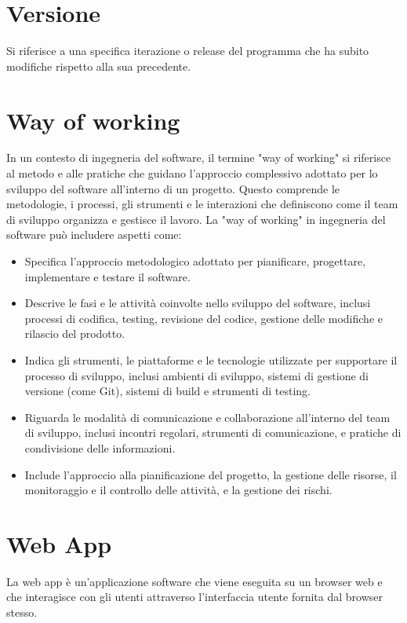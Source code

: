 \documentclass{article}
\begin{document}
\section{Versione}
Si riferisce a una specifica iterazione o release del programma che ha subito modifiche rispetto alla sua precedente.

\section{Way of working}

In un contesto di ingegneria del software, il termine "way of working" si riferisce al metodo e alle pratiche che guidano l'approccio complessivo adottato per lo sviluppo del software all'interno di un progetto. Questo comprende le metodologie, i processi, gli strumenti e le interazioni che definiscono come il team di sviluppo organizza e gestisce il lavoro. La "way of working" in ingegneria del software può includere aspetti come:
\begin{itemize}
    \item Specifica l'approccio metodologico adottato per pianificare, progettare, implementare e testare il software.
    \item Descrive le fasi e le attività coinvolte nello sviluppo del software, inclusi processi di codifica, testing, revisione del codice, gestione delle modifiche e rilascio del prodotto.
    \item Indica gli strumenti, le piattaforme e le tecnologie utilizzate per supportare il processo di sviluppo, inclusi ambienti di sviluppo, sistemi di gestione di versione (come Git), sistemi di build e strumenti di testing.
    \item Riguarda le modalità di comunicazione e collaborazione all'interno del team di sviluppo, inclusi incontri regolari, strumenti di comunicazione, e pratiche di condivisione delle informazioni.
    \item Include l'approccio alla pianificazione del progetto, la gestione delle risorse, il monitoraggio e il controllo delle attività, e la gestione dei rischi.
\end{itemize}

\section{Web App}
 La web app è un'applicazione software che viene eseguita su un browser web e che interagisce con gli utenti attraverso l'interfaccia utente fornita dal browser stesso.
\end{document}
